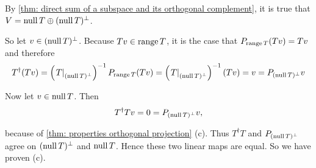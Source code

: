 \begin{prf}
   By \eqref{thm: direct sum of a subspace and its orthogonal complement}, it is true that $V=\operatorname{null} T \oplus (\operatorname{null} T)^\bot$.

  So let $v \in (\operatorname{null} T)^\bot$. Because $Tv \in \operatorname{range} T$, it is the case that $P_{\operatorname{range} T} (T v) = Tv$ and therefore
  \begin{equation}
    T^\dagger (T v)
    = \left( \left. T \right|_{(\operatorname{null} T)^\bot} \right)^{-1} P_{\operatorname{range} T} (Tv)
    = \left( \left. T \right|_{(\operatorname{null} T)^\bot} \right)^{-1} (Tv) = v = P_{(\operatorname{null} T)^\bot} v
  \end{equation}

  Now let $v \in \operatorname{null} T$. Then
  \[
    T^\dagger T v = 0 = P_{(\operatorname{null} T)^\bot} v,
  \]

  because of \ref{thm: properties orthogonal projection} (c). Thus $T^\dagger T$ and $P_{(\operatorname{null} T)^\bot}$ agree on $(\operatorname{null} T)^\bot$ and $\operatorname{null} T$. Hence these two linear maps are equal. So we have proven (c).
\end{prf}

